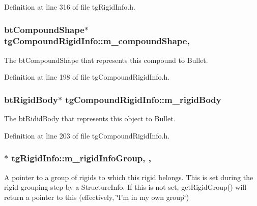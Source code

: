 Definition at line 316 of file tg\-Rigid\-Info.\-h.

\hypertarget{classtg_compound_rigid_info_aa358527f84ddf5d2e42face8598ff439}{
\subsubsection[{m\-\_\-compound\-Shape}]{\setlength{\rightskip}{0pt plus 5cm}bt\-Compound\-Shape$\ast$ tg\-Compound\-Rigid\-Info\-::m\-\_\-compound\-Shape\hspace{0.3cm}{\ttfamily [mutable]}, {\ttfamily [protected]}}}\label{classtg_compound_rigid_info_aa358527f84ddf5d2e42face8598ff439}
The bt\-Compound\-Shape that represents this compound to Bullet. 

Definition at line 198 of file tg\-Compound\-Rigid\-Info.\-h.

\hypertarget{classtg_compound_rigid_info_a1b1e22fe4f2693a8125c522fae7b68a2}{
\subsubsection[{m\-\_\-rigid\-Body}]{\setlength{\rightskip}{0pt plus 5cm}bt\-Rigid\-Body$\ast$ tg\-Compound\-Rigid\-Info\-::m\-\_\-rigid\-Body\hspace{0.3cm}{\ttfamily [protected]}}}\label{classtg_compound_rigid_info_a1b1e22fe4f2693a8125c522fae7b68a2}
The bt\-Ridid\-Body that represents this object to Bullet. 

Definition at line 203 of file tg\-Compound\-Rigid\-Info.\-h.

\hypertarget{classtg_rigid_info_a410205a69125205c4d63883e1fcfb0ae}{
\subsubsection[{m\-\_\-rigid\-Info\-Group}]{$\ast$ tg\-Rigid\-Info\-::m\-\_\-rigid\-Info\-Group\hspace{0.3cm}{\ttfamily [mutable]}, {\ttfamily [protected]}, {\ttfamily [inherited]}}}\label{classtg_rigid_info_a410205a69125205c4d63883e1fcfb0ae}
A pointer to a group of rigids to which this rigid belongs. This is set during the rigid grouping step by a Structure\-Info. If this is not set, get\-Rigid\-Group() will return a pointer to this (effectively, \char`\"{}\-I'm in my own group\char`\"{}) 

